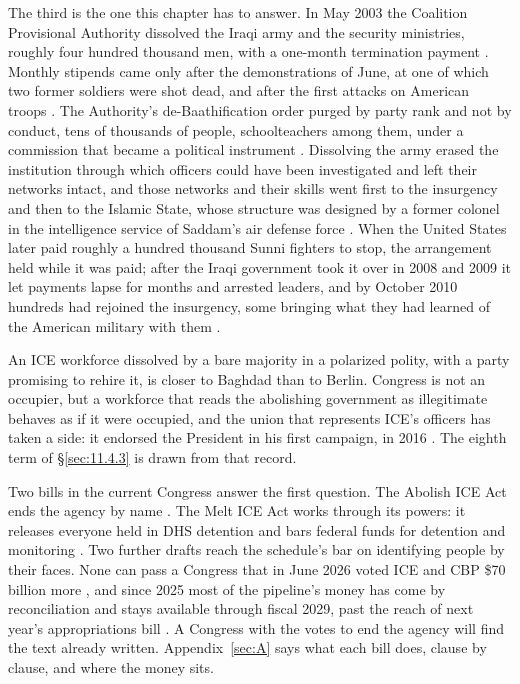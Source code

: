 The third is the one this chapter has to answer. In May 2003 the Coalition Provisional Authority dissolved the Iraqi army and the security ministries, roughly four hundred thousand men, with a one-month termination payment \autocite{cpa2003order2}. Monthly stipends came only after the demonstrations of June, at one of which two former soldiers were shot dead, and after the first attacks on American troops \autocite[158]{allawi2007occupation}. The Authority's de-Baathification order purged by party rank and not by conduct, tens of thousands of people, schoolteachers among them, under a commission that became a political instrument \autocite{cpa2003order1,sissons2013bitter}. Dissolving the army erased the institution through which officers could have been investigated and left their networks intact, and those networks and their skills went first to the insurgency and then to the Islamic State, whose structure was designed by a former colonel in the intelligence service of Saddam's air defense force \autocite{reuter2015terror}. When the United States later paid roughly a hundred thousand Sunni fighters to stop, the arrangement held while it was paid; after the Iraqi government took it over in 2008 and 2009 it let payments lapse for months and arrested leaders, and by October 2010 hundreds had rejoined the insurgency, some bringing what they had learned of the American military with them \autocite{williams2010sunnis}.

An ICE workforce dissolved by a bare majority in a polarized polity, with a party promising to rehire it, is closer to Baghdad than to Berlin. Congress is not an occupier, but a workforce that reads the abolishing government as illegitimate behaves as if it were occupied, and the union that represents ICE's officers has taken a side: it endorsed the President in his first campaign, in 2016 \autocite{porter2016iceunion}. The eighth term of \S\ref{sec:11.4.3} is drawn from that record.

Two bills in the current Congress answer the first question. The Abolish ICE Act ends the agency by name \autocite{hr7123}. The Melt ICE Act works through its powers: it releases everyone held in DHS detention and bars federal funds for detention and monitoring \autocite{hr7190}. Two further drafts reach the schedule's bar on identifying people by their faces. None can pass a Congress that in June 2026 voted ICE and CBP \$70 billion more \autocite{GT2026SecureAmerica}, and since 2025 most of the pipeline's money has come by reconciliation and stays available through fiscal 2029, past the reach of next year's appropriations bill \autocite{obbba2025}. A Congress with the votes to end the agency will find the text already written. Appendix~\ref{sec:A} says what each bill does, clause by clause, and where the money sits.
